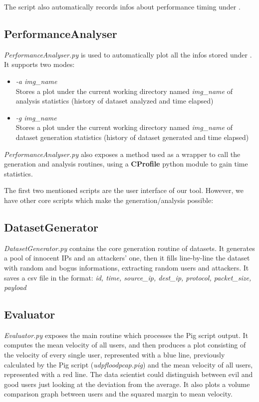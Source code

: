 The script also automatically records infos about performance timing under .

\subsection{PerformanceAnalyser}
\textit{PerformanceAnalyser.py} is used to automatically plot all the infos stored under . It supports two modes:
	\begin{itemize}
		\item \textit{-a img\_name} \\ Stores a plot under the current working directory named \textit{img\_name} of analysis statistics (history of dataset analyzed and time elapsed)
		\item \textit{-g img\_name} \\ Stores a plot under the current working directory named \textit{img\_name} of dataset generation statistics (history of dataset generated and time elapsed)
	\end{itemize}

\textit{PerformanceAnalyser.py} also exposes a method used as a wrapper to call the generation and analysis routines, using a \textbf{CProfile} python module to gain time statistics.

\bigskip
The first two mentioned scripts are the user interface of our tool. However, we have other core scripts which make the generation/analysis possible:

\subsection{DatasetGenerator}
\textit{DatasetGenerator.py} contains the core generation routine of datasets. It generates a pool of innocent IPs and an attackers' one, then it fills line-by-line the dataset with random and bogus informations, extracting random users and attackers. It saves a csv file in the format: \textit{id, time, source\_ip, dest\_ip, protocol, packet\_size, payload}

\subsection{Evaluator} 
\textit{Evaluator.py} exposes the main routine which processes the Pig script output. It computes the mean velocity of all users, and then produces a plot consisting of the velocity of every single user, represented with a blue line, previously calculated by the Pig script (\textit{udpfloodpcap.pig}) and the mean velocity of all users, represented with a red line. The data scientist could distinguish between evil and good users just looking at the deviation from the average. It also plots a volume comparison graph between users and the squared margin to mean velocity.

